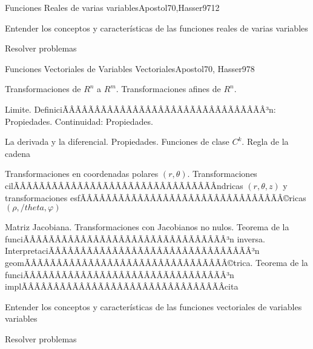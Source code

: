 \begin{sumilla}
\begin{unit}{Funciones Reales de varias variables}{Apostol70,Hasser97}{12}
   \begin{objetivos}
         \item  Entender los conceptos y caracter\'isticas de las funciones reales de varias variables
         \item  Resolver problemas
   \end{objetivos}
\end{unit}

\begin{unit}{Funciones Vectoriales de Variables Vectoriales}{Apostol70, Hasser97}{8}
   \begin{topicos}
         \item  Transformaciones de $R^n$ a $R^m$. Transformaciones afines de $R^n$.
	 \item  Limite. DefiniciÃÂÃÂÃÂÃÂÃÂÃÂÃÂÃÂÃÂÃÂÃÂÃÂÃÂÃÂÃÂÃÂ³n: Propiedades. Continuidad: Propiedades.
         \item  La derivada y la diferencial. Propiedades. Funciones de clase $C^k$. Regla de la cadena
	 \item  Transformaciones en coordenadas polares $(r,\theta)$. Transformaciones cilÃÂÃÂÃÂÃÂÃÂÃÂÃÂÃÂÃÂÃÂÃÂÃÂÃÂÃÂÃÂÃÂ­ndricas  $(r,\theta,z)$ y transformaciones esfÃÂÃÂÃÂÃÂÃÂÃÂÃÂÃÂÃÂÃÂÃÂÃÂÃÂÃÂÃÂÃÂ©ricas $(\rho,/theta,\varphi)$
         \item  Matriz Jacobiana. Transformaciones con Jacobianos no nulos. Teorema de la funciÃÂÃÂÃÂÃÂÃÂÃÂÃÂÃÂÃÂÃÂÃÂÃÂÃÂÃÂÃÂÃÂ³n inversa. InterpretaciÃÂÃÂÃÂÃÂÃÂÃÂÃÂÃÂÃÂÃÂÃÂÃÂÃÂÃÂÃÂÃÂ³n geomÃÂÃÂÃÂÃÂÃÂÃÂÃÂÃÂÃÂÃÂÃÂÃÂÃÂÃÂÃÂÃÂ©trica. Teorema de la funciÃÂÃÂÃÂÃÂÃÂÃÂÃÂÃÂÃÂÃÂÃÂÃÂÃÂÃÂÃÂÃÂ³n implÃÂÃÂÃÂÃÂÃÂÃÂÃÂÃÂÃÂÃÂÃÂÃÂÃÂÃÂÃÂÃÂ­cita
   \end{topicos}

   \begin{objetivos}
         \item  Entender los conceptos y caracter\'isticas de las funciones vectoriales de variables variables
         \item  Resolver problemas
   \end{objetivos}
\end{unit}


\end{sumilla}
